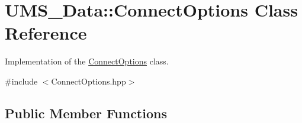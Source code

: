 \hypertarget{classUMS__Data_1_1ConnectOptions}{
\section{UMS\_\-Data::ConnectOptions Class Reference}
\label{classUMS__Data_1_1ConnectOptions}
}


Implementation of the \hyperlink{classUMS__Data_1_1ConnectOptions}{ConnectOptions} class.  




{\ttfamily \#include $<$ConnectOptions.hpp$>$}

\subsection*{Public Member Functions}
